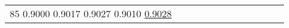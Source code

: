 \documentclass[runningheads]{llncs}
\begin{document}
\begin{table}[!ht]
\begin{tabular}{|p{7em}|p{2.5em}|p{2.5em}|p{3em}|p{2.5em}|p{3em}|p{2.5em}|p{3em}|p{2.5em}|p{3em}|p{2.5em}|p{3em}|}
85 \newline{}0.9000 \newline{}0.9017 \newline{}0.9027 \newline{}0.9010 \newline{}\underline{0.9028} \n
\end{tabular}
\end{table}
\end{document}
